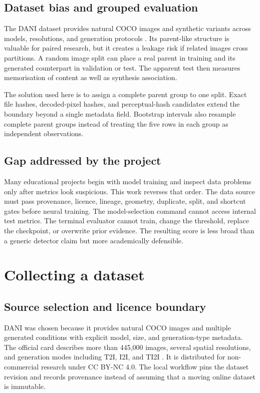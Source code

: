 \documentclass[12pt,a4paper]{article}
\begin{document}
\subsection{Dataset bias and grouped evaluation}

The DANI dataset provides natural COCO images and synthetic variants across models, resolutions,
and generation protocols \cite{liu2025djudge,dani2026card}. Its parent-like structure is valuable
for paired research, but it creates a leakage risk if related images cross partitions. A random
image split can place a real parent in training and its generated counterpart in validation or
test. The apparent test then measures memorisation of content as well as synthesis association.

The solution used here is to assign a complete parent group to one split. Exact file hashes,
decoded-pixel hashes, and perceptual-hash candidates extend the boundary beyond a single metadata
field. Bootstrap intervals also resample complete parent groups instead of treating the five rows
in each group as independent observations.

\subsection{Gap addressed by the project}

Many educational projects begin with model training and inspect data problems only after metrics
look suspicious. This work reverses that order. The data source must pass provenance, licence,
lineage, geometry, duplicate, split, and shortcut gates before neural training. The model-selection
command cannot access internal test metrics. The terminal evaluator cannot train, change the
threshold, replace the checkpoint, or overwrite prior evidence. The resulting score is less broad
than a generic detector claim but more academically defensible.

\section{Collecting a dataset}

\subsection{Source selection and licence boundary}

DANI was chosen because it provides natural COCO images and multiple generated conditions with
explicit model, size, and generation-type metadata. The official card describes more than
445,000 images, several spatial resolutions, and generation modes including T2I, I2I, and TI2I
\cite{dani2026card}. It is distributed for non-commercial research under CC BY-NC 4.0. The local
workflow pins the dataset revision and records provenance instead of assuming that a moving online
dataset is immutable.
\end{document}
